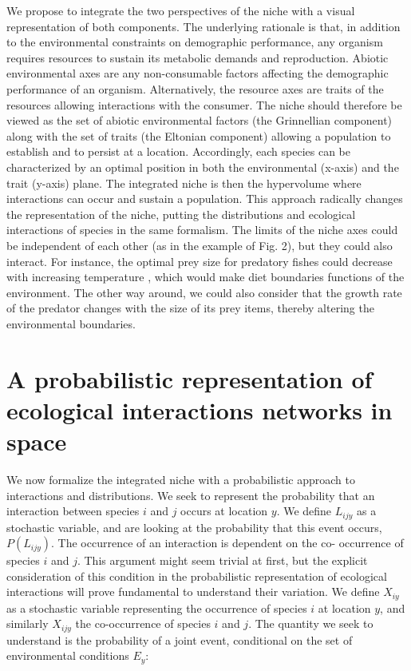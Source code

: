 \documentclass[12pt]{article}
\begin{document}
We propose to integrate the two perspectives of the niche with a visual
representation of both components. The underlying rationale is that, in
addition to the environmental constraints on demographic performance, any
organism requires resources to sustain its metabolic demands and reproduction.
Abiotic environmental axes are any non-consumable factors affecting the
demographic performance of an organism. Alternatively, the resource axes are
traits of the resources allowing interactions with the consumer. The niche
should therefore be viewed as the set of abiotic environmental factors (the
Grinnellian component) along with the set of traits (the Eltonian component)
allowing a population to establish and to persist at a location. Accordingly,
each species can be characterized by an optimal position in both the
environmental (x-axis) and the trait (y-axis) plane. The integrated niche is
then the hypervolume where interactions can occur and sustain a population.
This approach radically changes the representation of the niche, putting the
distributions and ecological interactions of species in the same formalism.
The limits of the niche axes could be independent of each other (as in the
example of Fig. 2), but they could also interact. For instance, the optimal
prey size for predatory fishes could decrease with increasing temperature
\citep{Lelong2015}, which would make diet boundaries functions of the
environment. The other way around, we could also consider that the growth rate
of the predator changes with the size of its prey items, thereby altering the
environmental boundaries.

\section*{A probabilistic representation of ecological interactions networks in space}

We now formalize the integrated niche with a probabilistic approach to
interactions and distributions. We seek to represent the probability that an
interaction between species $i$ and $j$ occurs at location $y$. We define $L_{ijy}$ as a
stochastic variable, and are looking at the probability that this event
occurs, $P(L_{ijy})$. The occurrence of an interaction is dependent on the co-
occurrence of species $i$ and $j$. This argument might seem trivial at first, but
the explicit consideration of this condition in the probabilistic
representation of ecological interactions will prove fundamental to understand
their variation. We define $X_{iy}$ as a stochastic variable representing the
occurrence of species $i$ at location $y$, and similarly $X_{ijy}$ the co-occurrence
of species $i$ and $j$. The quantity we seek to understand is the probability of a
joint event, conditional on the set of environmental conditions $E_y$:
\end{document}

